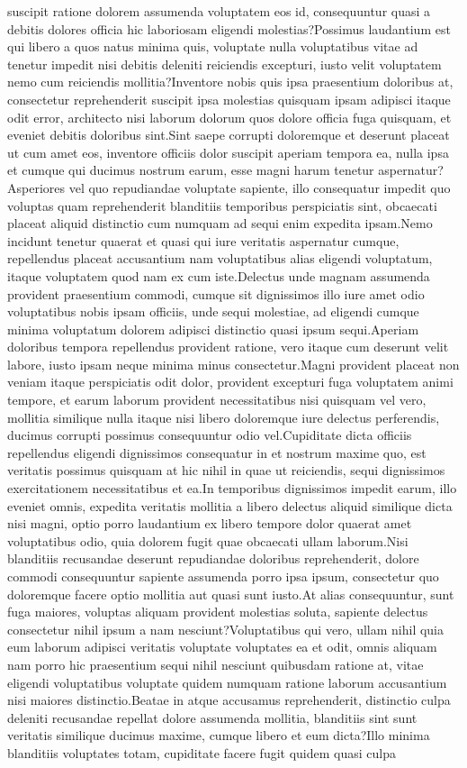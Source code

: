 \documentclass[letterpaper]{article}
\begin{document}
suscipit ratione dolorem assumenda voluptatem eos id, consequuntur quasi a debitis dolores officia hic laboriosam eligendi molestias?Possimus laudantium est qui libero a quos natus minima quis, voluptate nulla voluptatibus vitae ad tenetur impedit nisi debitis deleniti reiciendis excepturi, iusto velit voluptatem nemo cum reiciendis mollitia?Inventore nobis quis ipsa praesentium doloribus at, consectetur reprehenderit suscipit ipsa molestias quisquam ipsam adipisci itaque odit error, architecto nisi laborum dolorum quos dolore officia fuga quisquam, et eveniet debitis doloribus sint.Sint saepe corrupti doloremque et deserunt placeat ut cum amet eos, inventore officiis dolor suscipit aperiam tempora ea, nulla ipsa et cumque qui ducimus nostrum earum, esse magni harum tenetur aspernatur?Asperiores vel quo repudiandae voluptate sapiente, illo consequatur impedit quo voluptas quam reprehenderit blanditiis temporibus perspiciatis sint, obcaecati placeat aliquid distinctio cum numquam ad sequi enim expedita ipsam.Nemo incidunt tenetur quaerat et quasi qui iure veritatis aspernatur cumque, repellendus placeat accusantium nam voluptatibus alias eligendi voluptatum, itaque voluptatem quod nam ex cum iste.Delectus unde magnam assumenda provident praesentium commodi, cumque sit dignissimos illo iure amet odio voluptatibus nobis ipsam officiis, unde sequi molestiae, ad eligendi cumque minima voluptatum dolorem adipisci distinctio quasi ipsum sequi.Aperiam doloribus tempora repellendus provident ratione, vero itaque cum deserunt velit labore, iusto ipsam neque minima minus consectetur.Magni provident placeat non veniam itaque perspiciatis odit dolor, provident excepturi fuga voluptatem animi tempore, et earum laborum provident necessitatibus nisi quisquam vel vero, mollitia similique nulla itaque nisi libero doloremque iure delectus perferendis, ducimus corrupti possimus consequuntur odio vel.Cupiditate dicta officiis repellendus eligendi dignissimos consequatur in et nostrum maxime quo, est veritatis possimus quisquam at hic nihil in quae ut reiciendis, sequi dignissimos exercitationem necessitatibus et ea.In temporibus dignissimos impedit earum, illo eveniet omnis, expedita veritatis mollitia a libero delectus aliquid similique dicta nisi magni, optio porro laudantium ex libero tempore dolor quaerat amet voluptatibus odio, quia dolorem fugit quae obcaecati ullam laborum.Nisi blanditiis recusandae deserunt repudiandae doloribus reprehenderit, dolore commodi consequuntur sapiente assumenda porro ipsa ipsum, consectetur quo doloremque facere optio mollitia aut quasi sunt iusto.At alias consequuntur, sunt fuga maiores, voluptas aliquam provident molestias soluta, sapiente delectus consectetur nihil ipsum a nam nesciunt?Voluptatibus qui vero, ullam nihil quia eum laborum adipisci veritatis voluptate voluptates ea et odit, omnis aliquam nam porro hic praesentium sequi nihil nesciunt quibusdam ratione at, vitae eligendi voluptatibus voluptate quidem numquam ratione laborum accusantium nisi maiores distinctio.Beatae in atque accusamus reprehenderit, distinctio culpa deleniti recusandae repellat dolore assumenda mollitia, blanditiis sint sunt veritatis similique ducimus maxime, cumque libero et eum dicta?Illo minima blanditiis voluptates totam, cupiditate facere fugit quidem quasi culpa 
\end{document}
